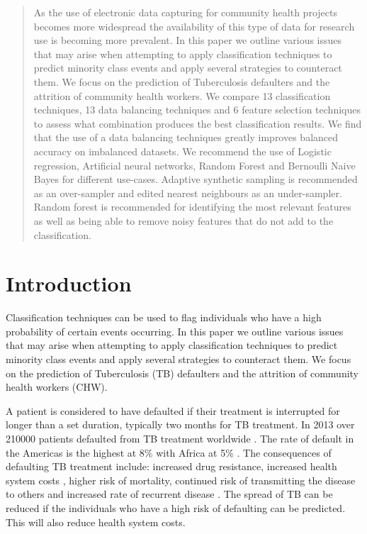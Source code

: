 \documentclass{sig-alternate-05-2015}
\begin{document}
	\maketitle
	\begin{abstract}
		As the use of electronic data capturing for community health projects becomes more widespread the availability of this type of data for research use is becoming more prevalent. In this paper we outline various issues that may arise when attempting to apply classification techniques to predict minority class events and apply several strategies to counteract them. We focus on the prediction of Tuberculosis defaulters and the attrition of community health workers. We compare 13 classification techniques, 13 data balancing techniques and 6 feature selection techniques to assess what combination produces the best classification results. We find that the use of a data balancing techniques greatly improves balanced accuracy on imbalanced datasets. We recommend the use of Logistic regression, Artificial neural networks, Random Forest and Bernoulli Naive Bayes for different use-cases. Adaptive synthetic sampling is recommended as an over-sampler and edited nearest neighbours as an under-sampler. Random forest is recommended for identifying the most relevant features as well as being able to remove noisy features that do not add to the classification.
	\end{abstract}
	
	\printccsdesc
	
	
	
	\section{Introduction}
	Classification techniques can be used to flag individuals who have a high probability of certain events occurring. In this paper we outline various issues that may arise when attempting to apply classification techniques to predict minority class events and apply several strategies to counteract them. We focus on the prediction of Tuberculosis (TB) defaulters and the attrition of community health workers (CHW).
		
	A patient is considered to have defaulted if their treatment is interrupted for longer than a set duration, typically two months for TB treatment. In 2013 over 210\hspace*{1mm}000 patients defaulted from TB treatment worldwide \cite{world2015TB}. The rate of default in the Americas is the highest at 8\% with Africa at 5\% \cite{world2015TB}. The consequences of defaulting TB treatment include: increased drug resistance, increased health system costs \cite{Lackey:10356751520150601, muture:6660173120110101}, higher risk of mortality, continued risk of transmitting the disease to others \cite{Lackey:10356751520150601} and increased rate of recurrent disease \cite{Jha:10.1371/journal.pone.0008873}. The spread of TB can be reduced if the individuals who have a high risk of defaulting can be predicted. This will also reduce health system costs.
	
\end{document}
